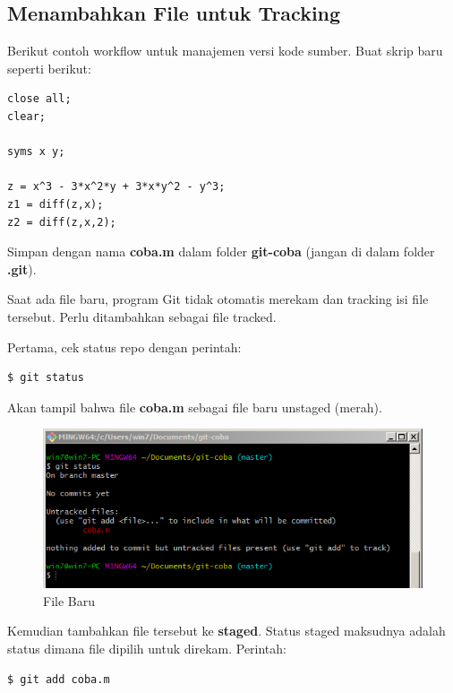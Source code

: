 \documentclass[12pt]{book}
\begin{document}
	\subsection{Menambahkan File untuk Tracking}
	
	Berikut contoh workflow untuk manajemen versi kode sumber.
	Buat skrip baru seperti berikut:
	\begin{verbatim}
close all;
clear;

syms x y;

z = x^3 - 3*x^2*y + 3*x*y^2 - y^3;
z1 = diff(z,x);
z2 = diff(z,x,2);
	\end{verbatim}

	Simpan dengan nama \textbf{coba.m} dalam folder \textbf{git-coba} (jangan di dalam folder \textbf{.git}).
	
	Saat ada file baru, program Git tidak otomatis merekam dan tracking isi file tersebut.
	Perlu ditambahkan sebagai file tracked.
	
	Pertama, cek status repo dengan perintah:
	\begin{verbatim}
$ git status
	\end{verbatim}

	Akan tampil bahwa file \textbf{coba.m} sebagai file baru unstaged (merah).
	
	\begin{figure}[!ht]
		\centering
		\includegraphics[width=400pt]{images/git3}
		\caption{File Baru}
	\end{figure}

	Kemudian tambahkan file tersebut ke \textbf{staged}.
	Status staged maksudnya adalah status dimana file dipilih untuk direkam.
	Perintah:
	\begin{verbatim}
$ git add coba.m
	\end{verbatim}
\end{document}

